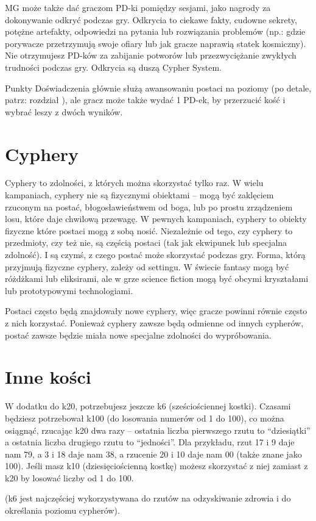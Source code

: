 MG może także dać graczom PD-ki pomiędzy sesjami, jako nagrody za dokonywanie odkryć podczas gry. Odkrycia to ciekawe fakty, cudowne sekrety, potężne artefakty, odpowiedzi na pytania lub rozwiązania problemów (np.: gdzie porywacze przetrzymują swoje ofiary lub jak gracze naprawią statek kosmiczny). Nie otrzymujesz PD-ków za zabijanie potworów lub przezwyciężanie zwykłych trudności podczas gry. Odkrycia są duszą Cypher System.

Punkty Doświadczenia głównie służą awansowaniu postaci na poziomy (po detale, patrz: rozdział ), ale gracz może także wydać 1 PD-ek, by przerzucić kość i wybrać leszy z dwóch wyników. 

\section  {Cyphery}

Cyphery to zdolności, z których można skorzystać tylko raz. W wielu kampaniach, cyphery nie są fizycznymi obiektami – mogą być zaklęciem rzuconym na postać, błogosławieństwem od boga, lub po prostu zrządzeniem losu, które daje chwilową przewagę. W pewnych kampaniach, cyphery to obiekty fizyczne które postaci mogą z sobą nosić. Niezależnie od tego, czy cyphery to przedmioty, czy też nie, są częścią postaci (tak jak ekwipunek lub specjalna zdolność). I są czymś, z czego postać może skorzystać podczas gry. Forma, którą przyjmują fizyczne cyphery, zależy od settingu. W świecie fantasy mogą być różdżkami lub eliksirami, ale w grze science fiction mogą być obcymi kryształami lub prototypowymi technologiami.

Postaci często będą znajdowały nowe cyphery, więc gracze powinni równie często z nich korzystać. Ponieważ cyphery zawsze będą odmienne od innych cypherów, postać zawsze będzie miała nowe specjalne zdolności do wypróbowania. 

\section {Inne kości}

W dodatku do k20, potrzebujesz jeszcze k6 (sześciościennej kostki). Czasami będziesz potrzebował k100 (do losowania numerów od 1 do 100), co można osiągnąć, rzucając k20 dwa razy – ostatnia liczba pierwszego rzutu to “dziesiątki” a ostatnia liczba drugiego rzutu to “jedności”. Dla przykładu, rzut 17 i 9 daje nam 79, a 3 i 18 daje nam 38, a rzucenie 20 i 10 daje nam 00 (także znane jako 100). Jeśli masz k10 (dziesięciościenną kostkę) możesz skorzystać z niej zamiast z k20 by losować liczby od 1 do 100.

(k6 jest najczęściej wykorzystywana do rzutów na odzyskiwanie zdrowia i do określania poziomu cypherów).